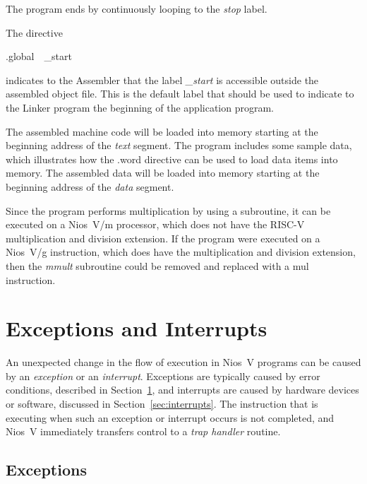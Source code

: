 \documentclass[11pt, twoside, pdftex]{article}
\begin{document}
\noindent
The program ends by continuously looping to the {\it stop} label.

The directive
\vspace{-\baselineskip}
\begin{center}
{\sf .global~~\_start}
\end{center} 
\noindent
indicates to the Assembler that the label {\it \_start} is accessible outside the
assembled object file. This is the default label that should be used to indicate to
the Linker program the beginning of the application program.

The assembled machine code will be loaded into memory starting 
at the beginning address of the {\it text} segment.
The program includes some sample data, which illustrates how the {\sf .word} directive 
can be used to load data items into memory. The assembled data will be loaded into 
memory starting at the beginning address of the {\it data} segment.

Since the program performs multiplication by using a subroutine, it can be executed on a
Nios~V/m processor, which does not have the RISC-V multiplication and division extension.
If the program were executed on a Nios~V/g instruction, which does have the multiplication
and division extension, then the {\it mmult} subroutine could be removed and replaced with a
{\sf mul} instruction. 

\section{Exceptions and Interrupts}
\label{sec:exceptions}

An unexpected change in the flow of execution in Nios~V programs can be caused by an
{\it exception} or an {\it interrupt}. Exceptions are typically caused by error conditions,
described in Section~\ref{sec:exceptions}, and interrupts are caused by hardware devices
or software, discussed in Section~\ref{sec:interrupts}. The instruction that is executing 
when such an exception or interrupt occurs is not completed, and Nios~V immediately 
transfers control to a {\it trap handler} routine.

\subsection{Exceptions}
\end{document}
